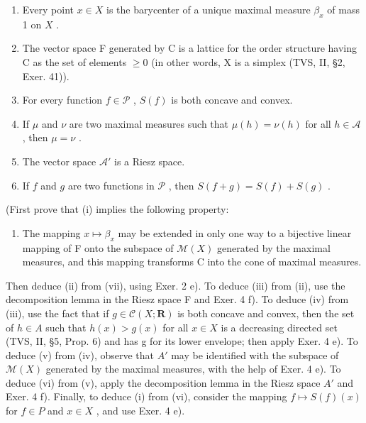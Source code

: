 \begin{enumerate}
\def\labelenumi{(\roman{enumi})}
\item
  Every point \(x \in X\) is the barycenter of a unique maximal measure \(\beta_x\) of mass 1 on \(X\) .
\item
  The vector space F generated by C is a lattice for the order structure having C as the set of elements \(\geqslant0\) (in other words, X is a simplex (TVS, II, §2, Exer. 41)).
\item
  For every function \(f \in \mathcal{P}\) , \(S(f)\) is both concave and convex.
\item
  If \(\mu\) and \(\nu\) are two maximal measures such that \(\mu(h) = \nu(h)\) for all \(h \in \mathcal{A}\) , then \(\mu = \nu\) .
\item
  The vector space \(\mathcal{A}'\) is a Riesz space.
\item
  If \(f\) and \(g\) are two functions in \(\mathcal{P}\) , then \(S(f + g) = S(f) + S(g)\) .
\end{enumerate}

(First prove that (i) implies the following property:

\begin{enumerate}
\def\labelenumi{(\roman{enumi})}
\setcounter{enumi}{6}
\tightlist
\item
  The mapping \(x \mapsto \beta_{x}\) may be extended in only one way to a bijective linear mapping of F onto the subspace of \(\mathcal{M}(X)\) generated by the maximal measures, and this mapping transforms C into the cone of maximal measures.
\end{enumerate}

Then deduce (ii) from (vii), using Exer. 2 e). To deduce (iii) from (ii), use the decomposition lemma in the Riesz space F and Exer. 4 f). To deduce (iv) from (iii), use the fact that if \(g \in \mathcal{C}(X; \mathbf{R})\) is both concave and convex, then the set of \(h \in A\) such that \(h(x) > g(x)\) for all \(x \in X\) is a decreasing directed set (TVS, II, §5, Prop. 6) and has g for its lower envelope; then apply Exer. 4 e). To deduce (v) from (iv), observe that \(A'\) may be identified with the subspace of \(\mathcal{M}(X)\) generated by the maximal measures, with the help of Exer. 4 e). To deduce (vi) from (v), apply the decomposition lemma in the Riesz space \(A'\) and Exer. 4 f). Finally, to deduce (i) from (vi), consider the mapping \(f \mapsto S(f)(x)\) for \(f \in P\) and \(x \in X\) , and use Exer. 4 e).

